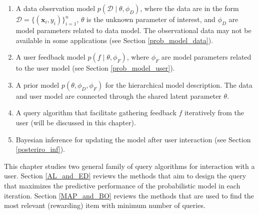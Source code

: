 \documentclass[dissertation,math,vertlayout,pdfa,colorlinks]{aaltoseries}
\newcommand{\bD}{\mathcal{D}}
\begin{document}
\begin{enumerate}
	\item A data observation model $p(\bD \mid \! \theta,\phi_D)$, where the data are in the form $\bD= \{(\bm{x}_i,y_i)\}_{i=1}^{n}$, $\theta$ is the unknown parameter of interest, and $\phi_D$ are model parameters related to data model. The observational data may not be available in some applications (see Section \ref{prob_model_data}). 
	\item A user feedback model $p(f\mid \theta, \phi_F)$, where $\phi_F$ are model parameters related to the user model (see Section \ref{prob_model_user}).
	\item A prior model $p(\theta, \phi_D, \phi_F)$ for the hierarchical model description. The data and user model are connected through the shared latent parameter $\theta$.
	\item A query algorithm that facilitate gathering feedback $f$ iteratively from the user (will be discussed in this chapter).
	\item Bayesian inference for updating the model after user interaction (see Section \ref{posteriro_inf}).
\end{enumerate}

This chapter studies two general family of query algorithms for interaction with a user. Section \ref{AL_and_ED} reviews the methods that aim to design the query that maximizes the predictive performance of the probabilistic model in each iteration. Section \ref{MAP_and_BO} reviews the methods that are used to find the most relevant (rewarding) item with minimum number of queries. 
\end{document}
